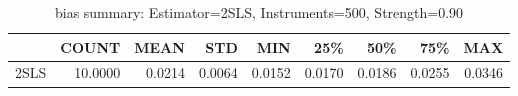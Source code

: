 \begin{table}[ht]
\centering
\caption{bias summary: Estimator=2SLS, Instruments=500, Strength=0.90}
\begin{tabular}{lrrrrrrrr}
\toprule
 & COUNT & MEAN & STD & MIN & 25\% & 50\% & 75\% & MAX \\
\midrule
2SLS & 10.0000 & 0.0214 & 0.0064 & 0.0152 & 0.0170 & 0.0186 & 0.0255 & 0.0346 \\
\bottomrule
\end{tabular}
\end{table}
